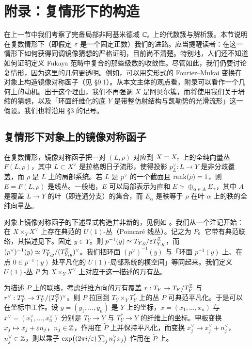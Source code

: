 \section{附录：复情形下的构造}

在上一节中我们考察了完备局部非阿基米德域 $\mathbb{C}_{\varepsilon}$ 上的代数簇与解析簇。本节说明在复数情形下（即假定 $\varepsilon$ 是一个固定正数）我们的进路。应当提醒读者：在这一情形下如何获得同调镜像猜想的严格证明，目前尚不清楚。特别地，人们还不知道如何证明定义 Fukaya 范畴中复合的那些级数的收敛性。尽管如此，我们仍要讨论复情形，因为这里的几何更透明。例如，可以用实形式的 Fourier--Mukai 变换在对象上构造镜像对称函子（见 \S9.1）。从本文主体的观点看，附录可以看作一个几何上的动机。出于这个理由，我们不再强调 $X$ 是阿贝尔簇，而将使用我们关于坍缩的猜想，以及「环面纤维化的底 $Y$ 是带整仿射结构与凯勒势的光滑流形」这一假设。我们也将沿用 \S3 的记号。

\subsection{复情形下对象上的镜像对称函子}

在复数情形，镜像对称函子把一对 $(L,\rho)$ 对应到 $X=X_{\varepsilon}$ 上的全纯向量丛 $F(L,\rho)$，其中 $L\subset X^{\vee}$ 是拉格朗日子流形，使得投影 $p^{\vee}_L:L\to Y$ 是非分歧覆盖，而 $\rho$ 是 $L$ 上的局部系统。若 $L$ 是 $p^{\vee}$ 的一个截面且 $\operatorname{rank}(\rho)=1$，则 $E=F(L,\rho)$ 是线丛。一般地，$E$ 可以局部表示为直和 $E\simeq\oplus_{\alpha\in A}E_{\alpha}$，其中 $A$ 是覆盖 $L\to Y$ 的叶（即连通分支）的集合，而 $E_{\alpha}$ 是秩等于 $\rho$ 在叶 $\alpha$ 上的秩的全纯向量丛。

对象上镜像对称函子的下述显式构造并非新的，见例如 \cite{AP}。我们从一个注记开始：在 $X\times_Y X^{\vee}$ 上存在典范的 $U(1)$-丛（Poincaré 线丛）。记之为 $P$。它带有典范联络，其描述见下。固定 $y\in Y$。则 $p^{-1}(y)\simeq T_{Y,y}/\varepsilon T^{\mathbb{Z}}_{Y,y}$，而 $(p^{\vee})^{-1}(y)\simeq T^{*}_{Y,y}/(T^{\mathbb{Z}}_{Y,y})^{\vee}$。我们把环面 $(p^{\vee})^{-1}(y)$ 与「环面 $p^{-1}(y)$ 上、在点 $0\in p^{-1}(y)$ 处平凡化的 $U(1)$-局部系统的模空间」等同起来。我们定义 $U(1)$-丛 $P$ 为 $X\times_Y X^{\vee}$ 上对应于这一描述的万有丛。

为描述 $P$ 上的联络，考虑纤维方向的万有覆盖 $r:T_Y\to T_Y/T^{\mathbb{Z}}_Y$ 与 $r^{\vee}:T^{*}_Y\to T^{*}_Y/(T^{\mathbb{Z}}_Y)^{\vee}$。则 $P$ 拉回到 $T_Y\times_Y T^{*}_Y$ 上的丛 $\tilde P$ 可典范平凡化。于是可以在坐标中工作。设 $y=(y_1,\dots,y_n)$ 是 $Y$ 上的坐标，$x=(x_1,\dots,x_n)$ 与 $x^{\vee}=(x_1^{\vee},\dots,x_n^{\vee})$ 分别是 $T_Y\to Y$ 与 $T^{*}_Y\to Y$ 的纤维上的坐标。甲板变换 $x_j\mapsto x_j+\varepsilon n_j$，$n_j\in\mathbb{Z}$，作用在 $\tilde P$ 上并保持平凡化，而变换 $x_j^{\vee}\mapsto x_j^{\vee}+n_j^{\vee}$，$n_j^{\vee}\in\mathbb{Z}$，则以乘子 $\exp\bigl((2\pi i/\varepsilon)\sum_j n_j^{\vee}x_j\bigr)$ 作用在 $\tilde P$ 上。

